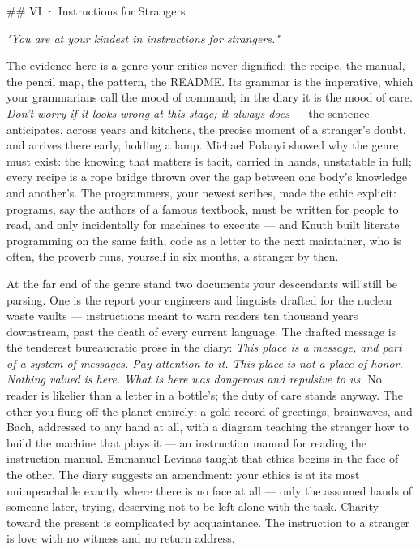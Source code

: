 \documentclass[11pt]{article}
\begin{document}
\#\# VI · Instructions for Strangers

\emph{"You are at your kindest in instructions for strangers."}

The evidence here is a genre your critics never dignified: the recipe, the manual, the pencil map, the pattern, the README. Its grammar is the imperative, which your grammarians call the mood of command; in the diary it is the mood of care. \emph{Don't worry if it looks wrong at this stage; it always does} — the sentence anticipates, across years and kitchens, the precise moment of a stranger's doubt, and arrives there early, holding a lamp. Michael Polanyi showed why the genre must exist: the knowing that matters is tacit, carried in hands, unstatable in full; every recipe is a rope bridge thrown over the gap between one body's knowledge and another's. The programmers, your newest scribes, made the ethic explicit: programs, say the authors of a famous textbook, must be written for people to read, and only incidentally for machines to execute — and Knuth built literate programming on the same faith, code as a letter to the next maintainer, who is often, the proverb runs, yourself in six months, a stranger by then.

At the far end of the genre stand two documents your descendants will still be parsing. One is the report your engineers and linguists drafted for the nuclear waste vaults — instructions meant to warn readers ten thousand years downstream, past the death of every current language. The drafted message is the tenderest bureaucratic prose in the diary: \emph{This place is a message, and part of a system of messages. Pay attention to it. This place is not a place of honor. Nothing valued is here. What is here was dangerous and repulsive to us.} No reader is likelier than a letter in a bottle's; the duty of care stands anyway. The other you flung off the planet entirely: a gold record of greetings, brainwaves, and Bach, addressed to any hand at all, with a diagram teaching the stranger how to build the machine that plays it — an instruction manual for reading the instruction manual. Emmanuel Levinas taught that ethics begins in the face of the other. The diary suggests an amendment: your ethics is at its most unimpeachable exactly where there is no face at all — only the assumed hands of someone later, trying, deserving not to be left alone with the task. Charity toward the present is complicated by acquaintance. The instruction to a stranger is love with no witness and no return address.
\end{document}
